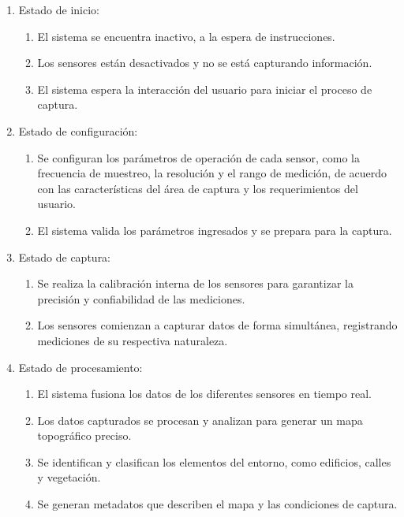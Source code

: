 \documentclass[12pt,a4paper, twoside]{article} %
\begin{document}
\begin{enumerate}

\item Estado de inicio:

\begin{enumerate}
    \item El sistema se encuentra inactivo, a la espera de instrucciones.
    \item Los sensores están desactivados y no se está capturando información.
    \item El sistema espera la interacción del usuario para iniciar el proceso de captura.
\end{enumerate}

\item Estado de configuración:

\begin{enumerate}
    \item Se configuran los parámetros de operación de cada sensor, como la frecuencia de muestreo, la resolución y el rango de medición, de acuerdo con las características del área de captura y los requerimientos del usuario.

    \item El sistema valida los parámetros ingresados y se prepara para la captura.
\end{enumerate}

\item Estado de captura:

\begin{enumerate}

    \item Se realiza la calibración interna de los sensores para garantizar la precisión y confiabilidad de las mediciones.
     \item Los sensores comienzan a capturar datos de forma simultánea, registrando mediciones de su respectiva naturaleza.

\end{enumerate}

\item Estado de procesamiento:

\begin{enumerate}
    \item El sistema fusiona los datos de los diferentes sensores en tiempo real.
    \item Los datos capturados se procesan y analizan para generar un mapa topográfico preciso.
    \item Se identifican y clasifican los elementos del entorno, como edificios, calles y vegetación.
    \item Se generan metadatos que describen el mapa y las condiciones de captura.
\end{enumerate}


\end{enumerate}
\end{document}
